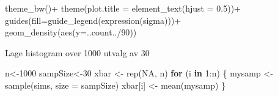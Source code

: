 \documentclass[
]{book}
\newenvironment{Shaded}{\begin{snugshade}}{\end{snugshade}}
\newcommand{\AttributeTok}[1]{\textcolor[rgb]{0.77,0.63,0.00}{#1}}
\newcommand{\ConstantTok}[1]{\textcolor[rgb]{0.00,0.00,0.00}{#1}}
\newcommand{\ControlFlowTok}[1]{\textcolor[rgb]{0.13,0.29,0.53}{\textbf{#1}}}
\newcommand{\DecValTok}[1]{\textcolor[rgb]{0.00,0.00,0.81}{#1}}
\newcommand{\FloatTok}[1]{\textcolor[rgb]{0.00,0.00,0.81}{#1}}
\newcommand{\FunctionTok}[1]{\textcolor[rgb]{0.00,0.00,0.00}{#1}}
\newcommand{\NormalTok}[1]{#1}
\newcommand{\OtherTok}[1]{\textcolor[rgb]{0.56,0.35,0.01}{#1}}
\newcommand{\SpecialCharTok}[1]{\textcolor[rgb]{0.00,0.00,0.00}{#1}}
\begin{document}
\begin{Shaded}
\begin{Highlighting}[]
  \FunctionTok{theme\_bw}\NormalTok{()}\SpecialCharTok{+}
  \FunctionTok{theme}\NormalTok{(}\AttributeTok{plot.title =} \FunctionTok{element\_text}\NormalTok{(}\AttributeTok{hjust =} \FloatTok{0.5}\NormalTok{))}\SpecialCharTok{+}
  \FunctionTok{guides}\NormalTok{(}\AttributeTok{fill=}\FunctionTok{guide\_legend}\NormalTok{(}\FunctionTok{expression}\NormalTok{(sigma)))}\SpecialCharTok{+}
  \FunctionTok{geom\_density}\NormalTok{(}\FunctionTok{aes}\NormalTok{(}\AttributeTok{y=}\NormalTok{..count..}\SpecialCharTok{/}\DecValTok{90}\NormalTok{))}
\end{Highlighting}
\end{Shaded}

Lage histogram over 1000 utvalg av 30

\begin{Shaded}
\begin{Highlighting}[]
\NormalTok{n}\OtherTok{\textless{}{-}}\DecValTok{1000}
\NormalTok{sampSize}\OtherTok{\textless{}{-}}\DecValTok{30}
\NormalTok{xbar }\OtherTok{\textless{}{-}} \FunctionTok{rep}\NormalTok{(}\ConstantTok{NA}\NormalTok{, n)}
\ControlFlowTok{for}\NormalTok{ (i }\ControlFlowTok{in} \DecValTok{1}\SpecialCharTok{:}\NormalTok{n) \{}
\NormalTok{  mysamp }\OtherTok{\textless{}{-}} \FunctionTok{sample}\NormalTok{(sims, }\AttributeTok{size =}\NormalTok{ sampSize)}
\NormalTok{  xbar[i] }\OtherTok{\textless{}{-}} \FunctionTok{mean}\NormalTok{(mysamp)}
\NormalTok{\}}


\end{Highlighting}
\end{Shaded}
\end{document}
